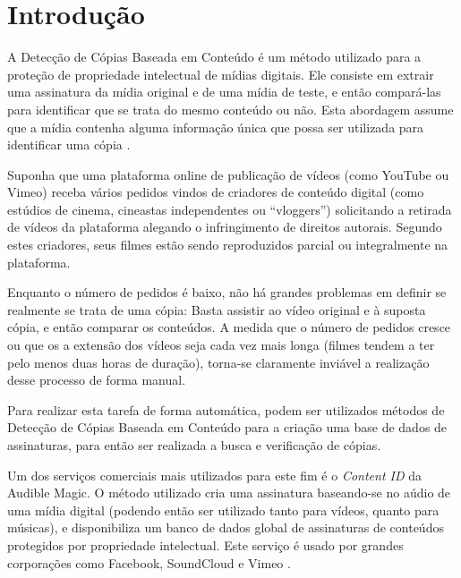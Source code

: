 \chapter{Introdução}
\label{chap:introducao}

A Detecção de Cópias Baseada em Conteúdo é um método utilizado para a proteção de propriedade intelectual de mídias digitais. Ele consiste em extrair uma assinatura da mídia original e de uma mídia de teste, e então compará-las para identificar que se trata do mesmo conteúdo ou não. Esta abordagem assume que a mídia contenha alguma informação única que possa ser utilizada para identificar uma cópia \citeauthor{kim2005spatiotemporal}. 

Suponha que uma plataforma online de publicação de vídeos (como YouTube ou Vimeo) receba vários pedidos vindos de criadores de conteúdo digital (como estúdios de cinema, cineastas independentes ou ``vloggers'') solicitando a retirada de vídeos da plataforma alegando o infringimento de direitos autorais. Segundo estes criadores, seus filmes estão sendo reproduzidos parcial ou integralmente na plataforma. 

Enquanto o número de pedidos é baixo, não há grandes problemas em definir se realmente se trata de uma cópia: Basta assistir ao vídeo original e à suposta cópia, e então comparar os conteúdos. A medida que o número de pedidos cresce ou que os a extensão dos vídeos seja cada vez mais longa (filmes tendem a ter pelo menos duas horas de duração), torna-se claramente inviável a realização desse processo de forma manual.


Para realizar esta tarefa de forma automática, podem ser utilizados métodos de Detecção de Cópias Baseada em Conteúdo para a criação uma base de dados de assinaturas, para então ser realizada a busca e verificação de cópias.

Um dos serviços comerciais mais utilizados para este fim é o \textit{Content ID} da Audible Magic. O método utilizado cria uma assinatura baseando-se no aúdio de uma mídia digital (podendo então ser utilizado tanto para vídeos, quanto para músicas), e disponibiliza um banco de dados global de assinaturas de conteúdos protegidos por propriedade intelectual. Este serviço é usado por grandes corporações como Facebook, SoundCloud e Vimeo \citeauthor{audiblemagic}.

